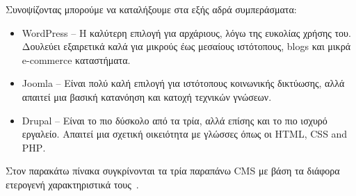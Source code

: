 \documentclass[12pt]{report}
\begin{document}
\begin{itemize}
Συνοψίζοντας μπορούμε να καταλήξουμε στα εξής αδρά συμπεράσματα:
\begin{itemize}
\item \textlatin{WordPress} – Η καλύτερη επιλογή για αρχάριους, λόγω της ευκολίας χρήσης του. Δουλεύει εξαιρετικά καλά για μικρούς έως μεσαίους ιστότοπους, \textlatin{blogs} και μικρά \textlatin{e-commerce} καταστήματα.
\item \textlatin{Joomla} – Είναι πολύ καλή επιλογή για ιστότοπους κοινωνικής δικτύωσης, αλλά απαιτεί μια βασική κατανόηση και κατοχή τεχνικών γνώσεων.
\item \textlatin{Drupal} – Είναι το πιο δύσκολο από τα τρία, αλλά επίσης και το πιο ισχυρό εργαλείο. Απαιτεί μια σχετική οικειότητα με γλώσσες όπως οι \textlatin{HTML, CSS and PHP}.
\end{itemize}

Στον παρακάτω πίνακα συγκρίνονται τα τρία παραπάνω \textlatin{CMS} με βάση τα διάφορα ετερογενή χαρακτηριστικά τους~\cite{comparison_tables}.


\end{itemize}
\end{document}

